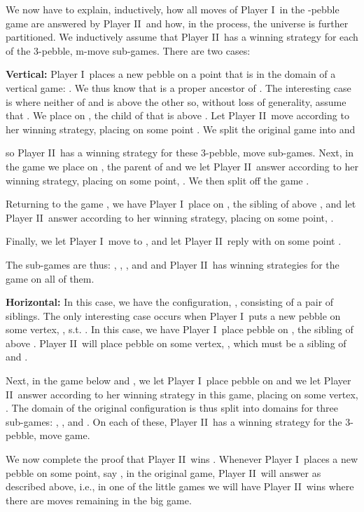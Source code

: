 \documentclass{LMCS}
\newcommand{\dupl}{Player II}
\newcommand{\spoiler}{Player I}
\theoremstyle{plain}
\theoremstyle{definition}
\begin{document}
We now have to explain, inductively, how all moves of \spoiler\ in the
-pebble game are answered by \dupl\ and how, in the process, the
universe is further partitioned.  We inductively assume that \dupl\
has a winning strategy for each of the 3-pebble, m-move sub-games.
There are two cases:

{\bf Vertical:}  \spoiler\ places a new pebble on a point  that is 
in the domain of a vertical game: .  We thus know that  is a proper
ancestor of .  The interesting case is where
neither of  and  is above the other so, without loss of generality,
assume that .  We place  on , the child of 
  that is above .  Let \dupl\
  move according to her winning strategy, placing  on some point
  .  We split the
  original game into  and  
 
so \dupl\ has a winning strategy for these 3-pebble, 
  move sub-games.  Next, in the   game we place
   on , the parent of  and we let \dupl\ answer
  according to her winning strategy, placing  on some point,
  .  We then split off the game .

Returning to the game ,  we have \spoiler\ place  on ,
the sibling of   above , and let \dupl\ answer according to her
winning strategy, placing  on some point, .  

Finally, we let \spoiler\ move  to , and let \dupl\ reply with 
on some point .  

The sub-games are thus:  , ,
, and  and \dupl\ has winning
strategies for the  game on all of them.  

{\bf Horizontal:}
In this case, we have the configuration, ,
consisting of a pair of siblings.  The only interesting case occurs
when \spoiler\ puts a new pebble on some vertex, , s.t. .  In this case, we have \spoiler\ place pebble  on , the
sibling of  above .  \dupl\ will place pebble  on some
vertex, , which must be a sibling of  and .  

Next, in the game below  and , we let \spoiler\ place pebble 
on  and we let \dupl\ answer according to her winning strategy in
this game, placing  on some vertex, .  The domain of the
original configuration is thus split into domains for three sub-games:  
,
, and
.  On each of these, \dupl\ has a winning strategy
for the 3-pebble,  move game.  

We now complete the proof that \dupl\ wins .
Whenever \spoiler\ places a new pebble on some point, say , in the
original game, \dupl\ will answer as described above, i.e., in one of
the little games we will have \dupl\ wins  where
there are  moves remaining in the big game.
\end{document}
